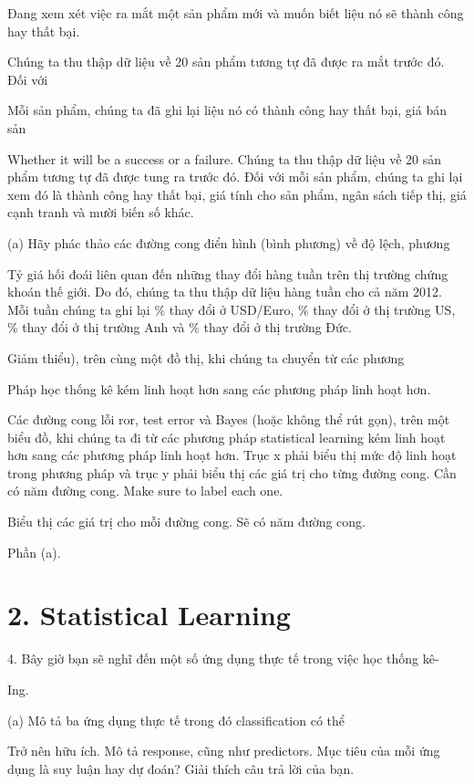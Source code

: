 Đang xem xét việc ra mắt một sản phẩm mới và muốn biết liệu nó sẽ thành công hay thất bại.

Chúng ta thu thập dữ liệu về 20 sản phẩm tương tự đã được ra mắt trước đó. Đối với

Mỗi sản phẩm, chúng ta đã ghi lại liệu nó có thành công hay thất bại, giá bán sản

Whether it will be a success or a failure. Chúng ta thu thập dữ liệu về 20 sản phẩm tương tự đã được tung ra trước đó. Đối với mỗi sản phẩm, chúng ta ghi lại xem đó là thành công hay thất bại, giá tính cho sản phẩm, ngân sách tiếp thị, giá cạnh tranh và mười biến số khác.

(a) Hãy phác thảo các đường cong điển hình (bình phương) về độ lệch, phương

Tỷ giá hối đoái liên quan đến những thay đổi hàng tuần trên thị trường chứng khoán thế giới. Do đó, chúng ta thu thập dữ liệu hàng tuần cho cả năm 2012. Mỗi tuần chúng ta ghi lại \% thay đổi ở USD/Euro, \% thay đổi ở thị trường US, \% thay đổi ở thị trường Anh và \% thay đổi ở thị trường Đức.

Giảm thiểu), trên cùng một đồ thị, khi chúng ta chuyển từ các phương

Pháp học thống kê kém linh hoạt hơn sang các phương pháp linh hoạt hơn.

Các đường cong lỗi ror, test error và Bayes (hoặc không thể rút gọn), trên một biểu đồ, khi chúng ta đi từ các phương pháp statistical learning kém linh hoạt hơn sang các phương pháp linh hoạt hơn. Trục x phải biểu thị mức độ linh hoạt trong phương pháp và trục y phải biểu thị các giá trị cho từng đường cong. Cần có năm đường cong. Make sure to label each one.

Biểu thị các giá trị cho mỗi đường cong. Sẽ có năm đường cong.

Phần (a).

\section{2. Statistical Learning}

4. Bây giờ bạn sẽ nghĩ đến một số ứng dụng thực tế trong việc học thống kê-

Ing.

(a) Mô tả ba ứng dụng thực tế trong đó classification có thể

Trở nên hữu ích. Mô tả response, cũng như predictors. Mục tiêu của mỗi ứng dụng là suy luận hay dự đoán? Giải thích câu trả lời của bạn.

